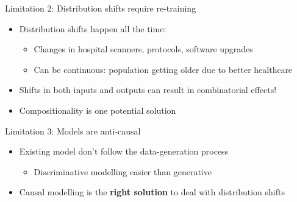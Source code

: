 \begin{frame}{Limitation 2: Distribution shifts require re-training}


\begin{itemize}
 \item Distribution shifts happen all the time:
 \begin{itemize}
 \item Changes in hospital scanners, protocols, software upgrades
 \item Can be continuous: population getting older due to better healthcare
\end{itemize}

\vspace{2em}
 \item Shifts in both inputs and outputs can result in combinatorial effects!
 
 \item Compositionality is one potential solution
 
\end{itemize}

\begin{center}
\end{center}
 
\end{frame}


\begin{frame}{Limitation 3: Models are anti-causal}


\begin{itemize}
 \item Existing model don't follow the data-generation process
\begin{itemize}
   \item Discriminative modelling easier than generative
\end{itemize}

 \vo
 
  
 \vo 
 
 \item Causal modelling is the \textbf{right solution} to deal with distribution shifts
 
 \vo
 
\end{itemize}


\begin{center}
\end{center}
 
\end{frame}



